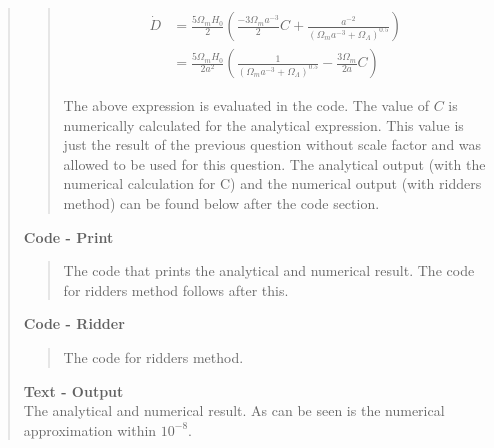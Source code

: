 \begin{quote}
\begin{quote}
\begin{align}
\dot{D} &= \frac{5 \Omega_m H_0}{2} \left( \frac{-3 \Omega_m a^{-3}}{2}C + \frac{a^{-2}}{\left( \Omega_m a^{-3} + \Omega_{\Lambda} \right)^{0.5}}  \right)  \\
&= \frac{5 \Omega_m H_0}{2 a^2} \left( \frac{1}{\left(\Omega_m a^{-3} + \Omega_{\Lambda} \right)^{0.5}} - \frac{3\Omega_m}{2a} C \right)
\end{align}

The above expression is evaluated in the code. The value of $C$ is numerically calculated for the analytical expression. This value is just the result of the previous question without scale factor and was allowed to be used for this question. The analytical output (with the numerical calculation for C) and the numerical output (with ridders method) can be found below after the code section.

\end{quote}
\newpage

\textbf{Code - Print} \\

\begin{quote}
The code that prints the analytical and numerical result. The code for ridders method follows after
this.

\end{quote}

\textbf{Code - Ridder} \\

\begin{quote}
The code for ridders method.

\end{quote}

\textbf{Text - Output} \\

The analytical and numerical result. As can be seen is the numerical approximation within $10^{-8}$. 
\begin{quote}

\end{quote}
\end{quote}





